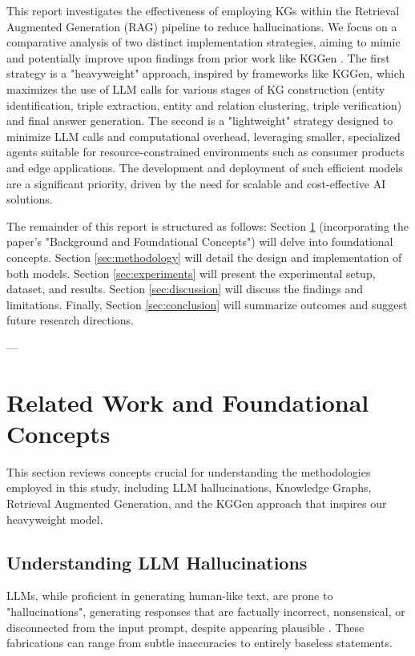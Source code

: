 \documentclass{article}
\begin{document}
This report investigates the effectiveness of employing KGs within the Retrieval Augmented Generation (RAG) \citep{lewis2020retrieval} pipeline to reduce hallucinations. We focus on a comparative analysis of two distinct implementation strategies, aiming to mimic and potentially improve upon findings from prior work like KGGen \citep{KGGen_Arxiv_2025}. The first strategy is a "heavyweight" approach, inspired by frameworks like KGGen, which maximizes the use of LLM calls for various stages of KG construction (entity identification, triple extraction, entity and relation clustering, triple verification) and final answer generation. The second is a "lightweight" strategy designed to minimize LLM calls and computational overhead, leveraging smaller, specialized agents suitable for resource-constrained environments such as consumer products and edge applications. The development and deployment of such efficient models are a significant priority, driven by the need for scalable and cost-effective AI solutions.

The remainder of this report is structured as follows: Section \ref{sec:related_work} (incorporating the paper's "Background and Foundational Concepts") will delve into foundational concepts. Section \ref{sec:methodology} will detail the design and implementation of both models. Section \ref{sec:experiments} will present the experimental setup, dataset, and results. Section \ref{sec:discussion} will discuss the findings and limitations. Finally, Section \ref{sec:conclusion} will summarize outcomes and suggest future research directions.

---
\section{Related Work and Foundational Concepts}
\label{sec:related_work}
This section reviews concepts crucial for understanding the methodologies employed in this study, including LLM hallucinations, Knowledge Graphs, Retrieval Augmented Generation, and the KGGen approach that inspires our heavyweight model.

\subsection{Understanding LLM Hallucinations}
LLMs, while proficient in generating human-like text, are prone to "hallucinations", generating responses that are factually incorrect, nonsensical, or disconnected from the input prompt, despite appearing plausible \citep{ji2023survey, rawte2023survey}. These fabrications can range from subtle inaccuracies to entirely baseless statements.
\end{document}
